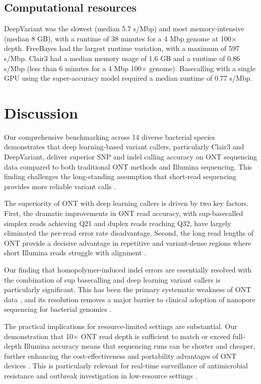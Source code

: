 \documentclass[11pt]{article}
\begin{document}
\subsection{Computational resources}

DeepVariant was the slowest (median 5.7 s/Mbp) and most memory-intensive (median 8 GB), with a runtime of 38 minutes for a 4 Mbp genome at 100$\times$ depth. FreeBayes had the largest runtime variation, with a maximum of 597 s/Mbp. Clair3 had a median memory usage of 1.6 GB and a runtime of 0.86 s/Mbp (less than 6 minutes for a 4 Mbp 100$\times$ genome). Basecalling with a single GPU using the super-accuracy model required a median runtime of 0.77 s/Mbp.

\section{Discussion}

Our comprehensive benchmarking across 14 diverse bacterial species demonstrates that deep learning-based variant callers, particularly Clair3 and DeepVariant, deliver superior SNP and indel calling accuracy on ONT sequencing data compared to both traditional ONT methods and Illumina sequencing. This finding challenges the long-standing assumption that short-read sequencing provides more reliable variant calls \citep{barbitoff2021}.

The superiority of ONT with deep learning callers is driven by two key factors. First, the dramatic improvements in ONT read accuracy, with sup-basecalled simplex reads achieving Q21 and duplex reads reaching Q32, have largely eliminated the per-read error rate disadvantage. Second, the long read lengths of ONT provide a decisive advantage in repetitive and variant-dense regions where short Illumina reads struggle with alignment \citep{treangen2012}.

Our finding that homopolymer-induced indel errors are essentially resolved with the combination of sup basecalling and deep learning variant callers is particularly significant. This has been the primary systematic weakness of ONT data \citep{delahaye2021, wick2022}, and its resolution removes a major barrier to clinical adoption of nanopore sequencing for bacterial genomics \citep{greig2019, david2023}.

The practical implications for resource-limited settings are substantial. Our demonstration that 10$\times$ ONT read depth is sufficient to match or exceed full-depth Illumina accuracy means that sequencing runs can be shorter and cheaper, further enhancing the cost-effectiveness and portability advantages of ONT devices \citep{quick2016, faria2016}. This is particularly relevant for real-time surveillance of antimicrobial resistance and outbreak investigation in low-resource settings \citep{meehan2021, hunt2023}.
\end{document}
